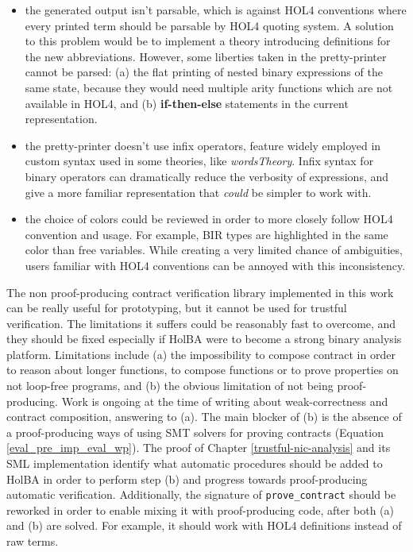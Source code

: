 \documentclass{kththesis}
\begin{document}
{\begin{itemize}
    \item the generated output isn't parsable, which is against HOL4 conventions where every printed term should be parsable by HOL4 quoting system. A solution to this problem would be to implement a theory introducing definitions for the new abbreviations. However, some liberties taken in the pretty-printer cannot be parsed: (a) the flat printing of nested binary expressions of the same state, because they would need multiple arity functions which are not available in HOL4, and (b) \textbf{if-then-else} statements in the current representation.
    \item the pretty-printer doesn't use infix operators, feature widely employed in custom syntax used in some theories, like \textit{wordsTheory}. Infix syntax for binary operators can dramatically reduce the verbosity of expressions, and give a more familiar representation that \textit{could} be simpler to work with.
    \item the choice of colors could be reviewed in order to more closely follow HOL4 convention and usage. For example, BIR types are highlighted in the same color than free variables. While creating a very limited chance of ambiguities, users familiar with HOL4 conventions can be annoyed with this inconsistency.
\end{itemize}

The non proof-producing contract verification library implemented in this work can be really useful for prototyping, but it cannot be used for trustful verification. The limitations it suffers could be reasonably fast to overcome, and they should be fixed especially if HolBA were to become a strong binary analysis platform. Limitations include (a) the impossibility to compose contract in order to reason about longer functions, to compose functions or to prove properties on not loop-free programs, and (b) the obvious limitation of not being proof-producing. Work is ongoing at the time of writing about weak-correctness and contract composition, answering to (a). The main blocker of (b) is the absence of a proof-producing ways of using SMT solvers for proving contracts (Equation \ref{eval_pre_imp_eval_wp}). The proof of Chapter \ref{trustful-nic-analysis} and its SML implementation identify what automatic procedures should be added to HolBA in order to perform step (b) and progress towards proof-producing automatic verification. Additionally, the signature of \texttt{prove\_contract} should be reworked in order to enable mixing it with proof-producing code, after both (a) and (b) are solved. For example, it should work with HOL4 definitions instead of raw terms.

}
\end{document}
